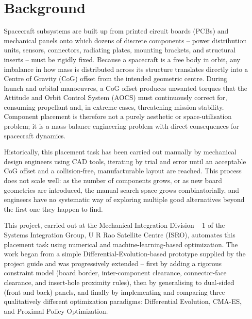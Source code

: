 \documentclass[11pt,a4paper,oneside]{report}
\begin{document}
\section{Background}
Spacecraft subsystems are built up from printed circuit boards (PCBs) and mechanical panels onto which dozens of discrete components -- power distribution units, sensors, connectors, radiating plates, mounting brackets, and structural inserts -- must be rigidly fixed. Because a spacecraft is a free body in orbit, any imbalance in how mass is distributed across its structure translates directly into a Centre of Gravity (CoG) offset from the intended geometric centre. During launch and orbital manoeuvres, a CoG offset produces unwanted torques that the Attitude and Orbit Control System (AOCS) must continuously correct for, consuming propellant and, in extreme cases, threatening mission stability. Component placement is therefore not a purely aesthetic or space-utilisation problem; it is a mass-balance engineering problem with direct consequences for spacecraft dynamics.

Historically, this placement task has been carried out manually by mechanical design engineers using CAD tools, iterating by trial and error until an acceptable CoG offset and a collision-free, manufacturable layout are reached. This process does not scale well: as the number of components grows, or as new board geometries are introduced, the manual search space grows combinatorially, and engineers have no systematic way of exploring multiple good alternatives beyond the first one they happen to find.

This project, carried out at the Mechanical Integration Division -- 1 of the Systems Integration Group, U R Rao Satellite Centre (ISRO), automates this placement task using numerical and machine-learning-based optimization. The work began from a simple Differential-Evolution-based prototype supplied by the project guide and was progressively extended -- first by adding a rigorous constraint model (board border, inter-component clearance, connector-face clearance, and insert-hole proximity rules), then by generalising to dual-sided (front and back) panels, and finally by implementing and comparing three qualitatively different optimization paradigms: Differential Evolution, CMA-ES, and Proximal Policy Optimization.
\clearpage
\end{document}
